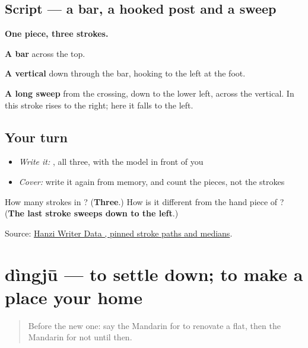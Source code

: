 \subsection*{Script — a bar, a hooked post and a sweep}

\begin{quote}
\end{quote}

\textbf{One piece, three strokes.}

\textbf{A bar} across the top.

\textbf{A vertical} down through the bar, hooking to the left at the foot.

\textbf{A long sweep} from the crossing, down to the lower left, across the vertical. In  this stroke rises to the right; here it falls to the left.

\subsection*{Your turn}
\begin{itemize}
\raggedright
  \item \emph{Write it:} , all three, with the model in front of you
  \item \emph{Cover:} write it again from memory, and count the pieces, not the strokes
\end{itemize}

\begin{tcolorbox}[breakable,colback=teal!4,colframe=teal!35!black,title={Before you move on}]
How many strokes in ? (\textbf{Three}.) How is it different from the hand piece of ? (\textbf{The last stroke sweeps down to the left}.)

Source: \href{https://raw.githubusercontent.com/chanind/hanzi-writer-data/68d10a4b21150cae5e1ebbd223eed289cf32d90c/data/\%E6\%89\%8D.json}{Hanzi Writer Data , pinned stroke paths and medians}.
\end{tcolorbox}
\section[dìngjū]{dìngjū — to settle down; to make a place your home}

\label{lesson:ZH-C313-dingju}



\begin{quote}
Before the new one: say the Mandarin for to renovate a flat, then the Mandarin for not until then.
\end{quote}

